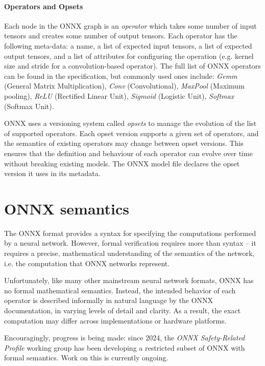 \paragraph{Operators and Opsets}

Each node in the ONNX graph is an \emph{operator} which takes some number of input tensors and creates some number of output tensors. Each operator has the following meta-data: a name, a list of expected input tensors, a list of expected output tensors, and a list of attributes for configuring the operation (e.g. kernel size and stride for a convolution-based operator). The full list of ONNX operators can be found in the specification, but commonly used ones include: 
\textit{Gemm} (General Matrix Multiplication), \textit{Conv} (Convolutional), \textit{MaxPool} (Maximum pooling), 	\textit{ReLU} (Rectified Linear Unit), \textit{Sigmoid} (Logistic Unit), \textit{Softmax} (Softmax Unit).

ONNX uses a versioning system called \emph{opsets} to manage the evolution of the list of supported operators. Each opset version supports a given set of operators, and the semantics of existing operators may change between opset versions.
This ensures that the definition and behaviour of each operator can evolve over time without breaking existing models. The ONNX model file declares the opset version it uses in its metadata.

\section{ONNX semantics}
\label{sec:onnx-semantics}

The ONNX format provides a syntax for specifying the computations performed by a neural network. However, formal verification requires more than syntax -- it requires a precise, mathematical understanding of the semantics of the network, i.e. the computation that ONNX networks represent. 

Unfortunately, like many other mainstream neural network formats, ONNX has no formal mathematical semantics. 
Instead, the intended behavior of each operator is described informally in natural language by the ONNX documentation, in varying levels of detail and clarity. 
As a result, the exact computation may differ across implementations or hardware platforms.

Encouragingly, progress is being made: since 2024, the \emph{ONNX Safety-Related Profile} working group has been developing a restricted subset of ONNX with formal semantics. 
Work on this is currently ongoing.

